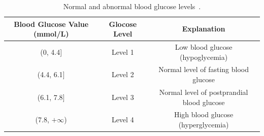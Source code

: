 \begin{table}[h]
  \centering
  \caption{Normal and abnormal blood glucose levels~\cite{bib:BGWiKi}.}
  \label{tab:blood_glucose_levels}
  \begin{tabular}{|c|c|c|}
  \hline
  \textbf{Blood Glucose Value (mmol/L)} & \textbf{Glocose Level} & \textbf{Explanation}                      \\ \hline
  (0, 4.4{]}                            & Level 1                & Low blood glucose (hypoglycemia)         \\ \hline
  (4.4, 6.1{]}                          & Level 2                & Normal level of fasting blood glucose      \\ \hline
  (6.1, 7.8{]}                          & Level 3                & Normal level of postprandial blood glucose \\ \hline
  (7.8, $+\infty$)                      & Level 4                & High blood glucose (hyperglycemia)          \\ \hline
  \end{tabular}
\end{table}
